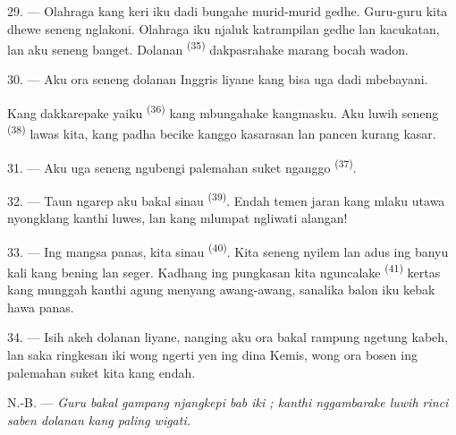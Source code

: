 29. --- Olahraga kang keri iku dadi bungahe murid-murid gedhe.
Guru-guru kita dhewe seneng nglakoni. Olahraga iku njaluk katrampilan
gedhe lan kacukatan, lan aku seneng banget. Dolanan
\textsuperscript{(35)} dakpasrahake marang bocah wadon.

30. --- Aku ora seneng dolanan Inggris liyane kang bisa uga dadi
mbebayani.

Kang dakkarepake yaiku \textsuperscript{(36)} kang
mbungahake kangmasku. Aku luwih seneng \textsuperscript{(38)} lawas kita, kang padha becike kanggo
kasarasan lan pancen kurang kasar.

\VUsaut{4.6mm}
\VUsaut{3.0mm}

31. --- Aku uga seneng ngubengi palemahan suket nganggo
\textsuperscript{(37)}.

32. --- Taun ngarep aku bakal sinau \textsuperscript{(39)}. Endah temen jaran kang mlaku utawa nyongklang
kanthi luwes, lan kang mlumpat ngliwati alangan!

33. --- Ing mangsa panas, kita sinau \textsuperscript{(40)}.
Kita seneng nyilem lan adus ing banyu kali kang bening lan seger.
Kadhang ing pungkasan kita nguncalake \textsuperscript{(41)}
kertas kang munggah kanthi agung menyang awang-awang, sanalika balon
iku kebak hawa panas.

34. --- Isih akeh dolanan liyane, nanging aku ora bakal rampung
ngetung kabeh, lan saka ringkesan iki wong ngerti yen ing dina Kemis,
wong ora bosen ing palemahan suket kita kang endah.

N.-B. --- \textit{Guru bakal gampang njangkepi bab iki ; kanthi
nggambarake luwih rinci saben dolanan kang paling wigati.}
